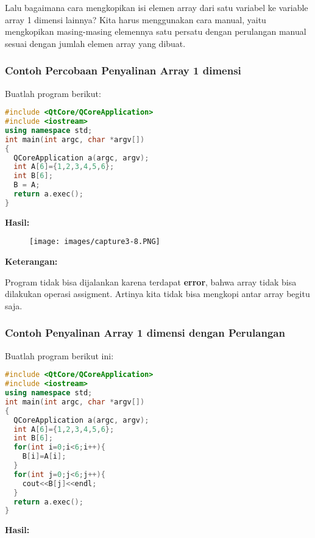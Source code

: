 Lalu bagaimana cara mengkopikan isi elemen array dari satu variabel ke
variable array 1 dimensi lainnya? Kita harus menggunakan cara manual,
yaitu mengkopikan masing-masing elemennya satu persatu dengan perulangan
manual sesuai dengan jumlah elemen array yang dibuat.

\subsubsection*{Contoh  Percobaan Penyalinan Array 1 dimensi}

Buatlah program berikut:

\begin{lstlisting}[language=c++, caption=Percobaan Penyalinan Array 1 dimensi, label=contoh3-8]
#include <QtCore/QCoreApplication>
#include <iostream>
using namespace std;
int main(int argc, char *argv[])
{
  QCoreApplication a(argc, argv);
  int A[6]={1,2,3,4,5,6};
  int B[6];
  B = A;
  return a.exec();
}
\end{lstlisting}

\textbf{Hasil:}

\begin{figure}[htbp]
\centering
\texttt{[image: images/capture3-8.PNG]}

\end{figure}

\textbf{Keterangan:}

Program tidak bisa dijalankan karena terdapat \textbf{error}, bahwa
array tidak bisa dilakukan operasi assigment. Artinya kita tidak bisa
mengkopi antar array begitu saja.

\subsubsection*{Contoh  Penyalinan Array 1 dimensi dengan Perulangan}

Buatlah program berikut ini:

\begin{lstlisting}[language=c++, caption=Penyalinan Array 1 dimensi dengan Perulangan, label=contoh3-8]
#include <QtCore/QCoreApplication>
#include <iostream>
using namespace std;
int main(int argc, char *argv[])
{
  QCoreApplication a(argc, argv);
  int A[6]={1,2,3,4,5,6};
  int B[6];
  for(int i=0;i<6;i++){
    B[i]=A[i];
  }
  for(int j=0;j<6;j++){
    cout<<B[j]<<endl;
  }
  return a.exec();
}
\end{lstlisting}

\textbf{Hasil:}

